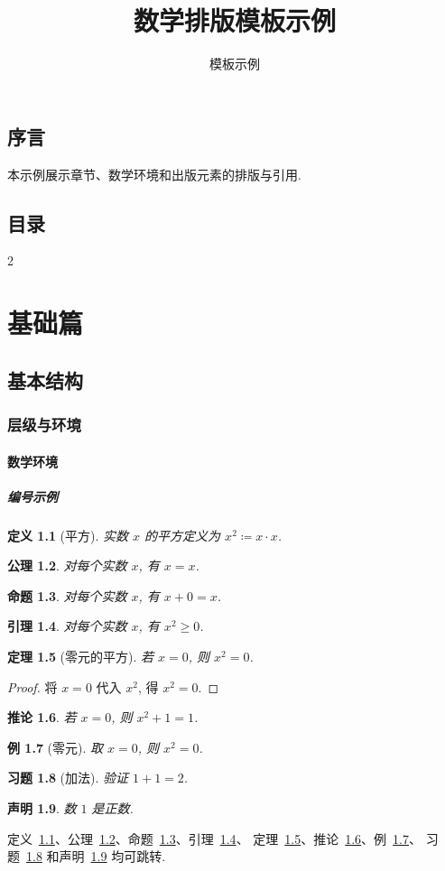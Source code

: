 \documentclass[UTF8,12pt,oneside,fontset=fandol]{ctexbook}
\makeatletter
\theoremstyle{mtfang}
\theoremstyle{bookheading}
\newtheorem{theorem}{定理}[chapter]
\newtheorem{definition}[theorem]{定义}
\newtheorem{proposition}[theorem]{命题}
\newtheorem{lemma}[theorem]{引理}
\newtheorem{corollary}[theorem]{推论}
\theoremstyle{bookheading}
\newtheorem{claim}[theorem]{声明}
\newtheorem{axiom}[theorem]{公理}
\renewcommand{\tableofcontents}{%
    \chapter*{目录}%
    \begin{multicols}{2}\@starttoc{toc}\end{multicols}}
\theoremstyle{bookexample}
\newtheorem{example}[theorem]{例}
\newtheorem{exercise}[theorem]{习题}
\makeatother
\begin{document}
\title{数学排版模板示例}
\author{模板示例}
\date{}
\maketitle
\frontmatter
\chapter*{序言}
本示例展示章节、数学环境和出版元素的排版与引用.
\newpage
\tableofcontents
\newpage
\mainmatter
\part{基础篇}

\chapter{基本结构}\label{ch:structure}
\section{层级与环境}\label{sec:env}
\subsection{数学环境}
\subsubsection{编号示例}
\begin{definition}[平方]\label{def:square}
    实数 $x$ 的平方定义为 $x^2 \coloneqq x \cdot x$.
\end{definition}
\begin{axiom}\label{ax:one}
    对每个实数 $x$, 有 $x = x$.
\end{axiom}
\begin{proposition}\label{prop:one}
    对每个实数 $x$, 有 $x + 0 = x$.
\end{proposition}
\begin{lemma}\label{lem:one}
    对每个实数 $x$, 有 $x^2 \geq 0$.
\end{lemma}
\begin{theorem}[零元的平方]\label{thm:one}
    若 $x = 0$, 则 $x^2 = 0$.
\end{theorem}
\begin{proof}
    将 $x = 0$ 代入 $x^2$, 得 $x^2 = 0$.
\end{proof}
\begin{corollary}\label{cor:one}
    若 $x = 0$, 则 $x^2 + 1 = 1$.
\end{corollary}
\begin{example}[零元]\label{ex:one}
    取 $x = 0$, 则 $x^2 = 0$.
\end{example}
\begin{exercise}[加法]\label{exercise:one}
    验证 $1 + 1 = 2$.
\end{exercise}
\begin{claim}\label{claim:one}
    数 $1$ 是正数.
\end{claim}
定义~\ref{def:square}、公理~\ref{ax:one}、命题~\ref{prop:one}、引理~\ref{lem:one}、
定理~\ref{thm:one}、推论~\ref{cor:one}、例~\ref{ex:one}、
习题~\ref{exercise:one} 和声明~\ref{claim:one} 均可跳转.
\end{document}
